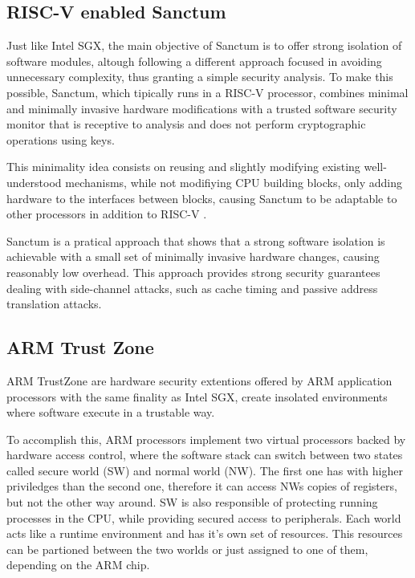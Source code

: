\subsection{RISC-V enabled Sanctum}

Just like Intel SGX, the main objective of Sanctum is to offer strong isolation of software modules, altough following a different approach focused in avoiding unnecessary complexity, thus granting a simple security analysis.
To make this possible, Sanctum, which tipically runs in a RISC-V processor, combines minimal and minimally invasive hardware modifications with a trusted software security monitor that is receptive to analysis and does not perform cryptographic operations using keys. 

This minimality idea consists on reusing and slightly modifying existing well-understood mechanisms, while not modifiying CPU building blocks, only adding hardware to the interfaces between blocks, causing Sanctum to be adaptable to other processors in addition to RISC-V \cite{sanctumPaper}. 

Sanctum is a pratical approach that shows that a strong software isolation is achievable with a small set of minimally invasive hardware changes, causing reasonably low overhead. 
This approach provides strong security guarantees dealing with side-channel attacks, such as cache timing and passive address translation attacks.

\subsection{ARM Trust Zone}

ARM TrustZone are hardware security extentions offered by ARM application processors with the same finality as Intel SGX, create insolated environments where software execute in a trustable way. 

To accomplish this, ARM processors implement two virtual processors backed by hardware access control, where the software stack can switch between two states called secure world (SW) and normal world (NW). 
The first one has with higher priviledges than the second one, therefore it can access NWs copies of registers, but not the other way around. SW is also responsible of protecting running processes in the CPU, while providing secured access to peripherals. 
Each world acts like a runtime environment and has it's own set of resources. This resources can be partioned between the two worlds or just assigned to one of them, depending on the ARM chip.

